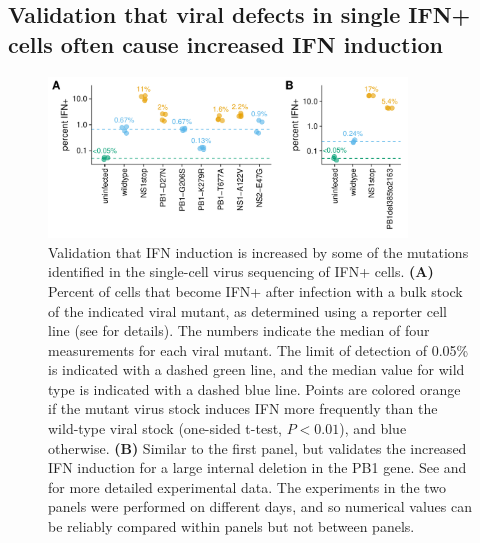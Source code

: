\documentclass[9pt,lineno]{elife}
\begin{document}
\subsection{Validation that viral defects in single IFN+ cells often cause increased IFN induction}

\begin{figure}

\centerline{\includegraphics[width=0.85\textwidth]{figures/Validation_Figure/ifn_plot.pdf}}
\caption{Validation that IFN induction is increased by some of the mutations identified in the single-cell virus sequencing of IFN+ cells.
{\bf (A)}
Percent of cells that become IFN+ after infection with a bulk stock of the indicated viral mutant, as determined using a reporter cell line (see  for details).
The numbers indicate the median of four measurements for each viral mutant.
The limit of detection of 0.05\% is indicated with a dashed green line, and the median value for wild type is indicated with a dashed blue line.
Points are colored orange if the mutant virus stock induces IFN more frequently than the wild-type viral stock (one-sided t-test, $P < 0.01$), and blue otherwise.
{\bf (B)}
Similar to the first panel, but validates the increased IFN induction for a large internal deletion in the PB1 gene.
See  and  for more detailed experimental data.
The experiments in the two panels were performed on different days, and so numerical values can be reliably compared within panels but not between panels.
}
\label{fig:validation}


\end{figure}
\end{document}
